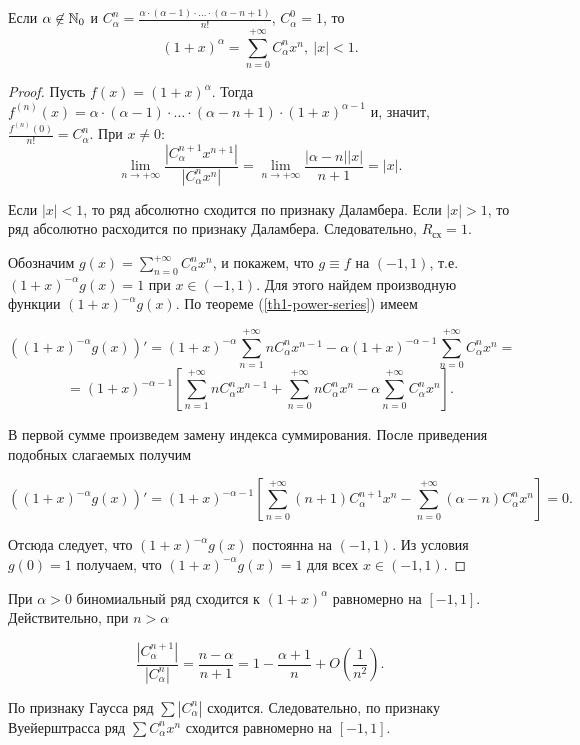 \begin{theorem}
    Если $\alpha \not\in \mathbb{N}_{0}$ и $C_{\alpha}^{n} = \frac{\alpha \cdot (\alpha - 1) \cdot \ldots \cdot (\alpha - n + 1)}{n!}$, $C_{\alpha}^{0} = 1$, то 
    \[(1 + x)^{\alpha} = \sum_{n = 0}^{+\infty} C_{\alpha}^{n}x^{n}, \ |x| < 1.\]
\end{theorem}

\begin{proof}
    Пусть $f(x) = (1 + x)^{\alpha}$. Тогда $f^{(n)}(x) = \alpha \cdot (\alpha - 1) \cdot \ldots \cdot (\alpha - n + 1) \cdot (1 + x)^{\alpha - 1}$ и, значит, $\frac{f^{(n)}(0)}{n!} = C_{\alpha}^{n}$. При $x \not= 0$:
    \[\lim_{n \to +\infty}\frac{|C_{\alpha}^{n + 1} x^{n + 1}|}{|C_{\alpha}^{n}x^{n}|} = \lim_{n \to +\infty} \frac{|\alpha - n||x|}{n + 1} = |x|.\]
    
    Если $|x| < 1$, то ряд абсолютно сходится по признаку Даламбера.
    Если $|x| > 1$, то ряд абсолютно расходится по признаку Даламбера.
    Следовательно, $R_{\text{сх}} = 1$.

    Обозначим $g(x) = \sum_{n = 0}^{+\infty} C_{\alpha}^{n}x^{n}$, и покажем, что $g \equiv f$ на $(-1, 1)$, т.е. $(1 + x)^{-\alpha} g(x) = 1$ при $x \in (-1, 1)$. Для этого найдем производную функции $(1 + x)^{-\alpha} g(x)$. По теореме (\ref{th1-power-series}) имеем
    
    \[((1 + x)^{-\alpha} g(x))' = (1 + x)^{-\alpha} \sum_{n = 1}^{+\infty}n C_{\alpha}^{n}x^{n - 1} - \alpha(1 + x)^{-\alpha - 1} \sum_{n = 0}^{+\infty} C_{\alpha}^{n}x^{n} = \]
    \[ = (1 + x)^{-\alpha - 1}\left[\sum_{n = 1}^{+\infty}n C_{\alpha}^{n} x^{n - 1} + \sum_{n = 0}^{+\infty}n C_{\alpha}^{n}x^{n} - \alpha \sum_{n = 0}^{+\infty}C_{\alpha}^{n} x^{n}\right].\]

    В первой сумме произведем замену индекса суммирования. После приведения подобных слагаемых получим

    \[((1 + x)^{-\alpha} g(x))' = (1 + x)^{-\alpha - 1}\left[\sum_{n = 0}^{+\infty}(n + 1) C_{\alpha}^{n + 1} x^{n} - \sum_{n = 0}^{+\infty}(\alpha - n) C_{\alpha}^{n}x^{n}\right] = 0.\]

    Отсюда следует, что $(1 + x)^{-\alpha} g(x)$ постоянна на $(-1, 1)$. Из условия $g(0) = 1$ получаем, что $(1 + x)^{-\alpha}g(x) = 1$ для всех $x \in (-1, 1)$.
\end{proof}

\begin{note}
    При $\alpha > 0$ биномиальный ряд сходится к $(1 + x)^{\alpha}$ равномерно на $[-1, 1]$. Действительно, при $n > \alpha$

    \[\frac{|C_{\alpha}^{n + 1}|}{|C_{\alpha}^{n}|} = \frac{n - \alpha}{n + 1} = 1 - \frac{\alpha + 1}{n} + O(\frac{1}{n^2}).\]

    По признаку Гаусса ряд $\sum|C_{\alpha}^{n}|$ сходится. Следовательно, по признаку Вуейерштрасса ряд $\sum C_{\alpha}^{n}x^{n}$ сходится равномерно на $[-1, 1]$.
\end{note}

